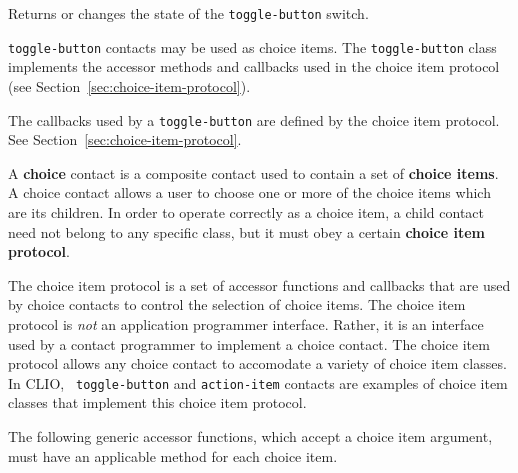 \begin{flushright} \parbox[t]{6.125in}{
Returns or changes the state of the {\tt toggle-button} switch. }
\end{flushright}

{\tt toggle-button} contacts may be used as choice items. The {\tt toggle-button} class
implements the accessor methods and callbacks used in the choice item protocol (see
Section~\ref{sec:choice-item-protocol}).


The callbacks used by a {\tt toggle-button} are defined by the choice item
protocol.
See Section~\ref{sec:choice-item-protocol}.



\vfill\pagebreak



A {\bf choice} contact is a composite contact used to contain a
set of {\bf choice items}.  A choice contact allows a user
to choose one or more of the choice items which are its children.
In order to operate correctly as a choice item, a child contact need not belong
to any specific class, but it must obey a certain {\bf choice item
protocol}.  


The choice item protocol is a set of accessor functions and callbacks
that are used by choice contacts to control the selection of choice
items.  The choice item protocol is {\em not} an application programmer
interface.  Rather, it is an interface used by a contact programmer to
implement a choice contact.  The choice item protocol allows any choice
contact to accomodate a variety of choice item classes.  In CLIO, {\tt
toggle-button} and {\tt action-item} contacts are examples of choice
item classes that implement this choice item protocol.

The following generic accessor functions, which accept a choice
item argument, must have an applicable method for each choice item.


